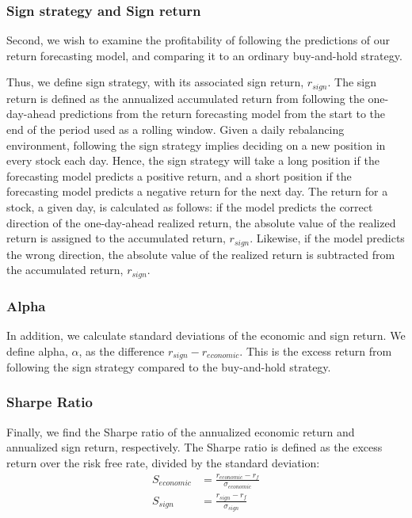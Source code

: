 \subsubsection{Sign strategy and Sign return}
Second, we wish to examine the profitability of following the predictions of our return forecasting model, and comparing it to an ordinary buy-and-hold strategy. 

Thus, we define sign strategy, with its associated sign return, $r_{sign}$. The sign return is defined as the annualized accumulated return from following the one-day-ahead predictions from the return forecasting model from the start to the end of the period used as a rolling window. Given a daily rebalancing environment, following the sign strategy implies deciding on a new position in every stock each day. Hence, the sign strategy will take a long position if the forecasting model predicts a positive return, and a short position if the forecasting model predicts a negative return for the next day. The return for a stock, a given day, is calculated as follows: if the model predicts the correct direction of the one-day-ahead realized return, the absolute value of the realized return is assigned to the accumulated return, $r_{sign}$. Likewise, if the model predicts the wrong direction, the absolute value of the realized return is subtracted from the accumulated return, $r_{sign}$. 

\subsubsection{Alpha}
In addition, we calculate standard deviations of the economic and sign return. We define alpha, $\alpha$, as the difference $r_{sign}-r_{economic}$. This is the excess return from following the sign strategy compared to the buy-and-hold strategy. 

\subsubsection{Sharpe Ratio}
Finally, we find the Sharpe ratio of the annualized economic return and annualized sign return, respectively. The Sharpe ratio is defined as the excess return over the risk free rate, divided by the standard deviation:
\begin{align}
    S_{economic} &= \frac{r_{economic}-r_f}{\sigma_{economic}} \\
    S_{sign} &= \frac{r_{sign}-r_f}{\sigma_{sign}}
\end{align}
